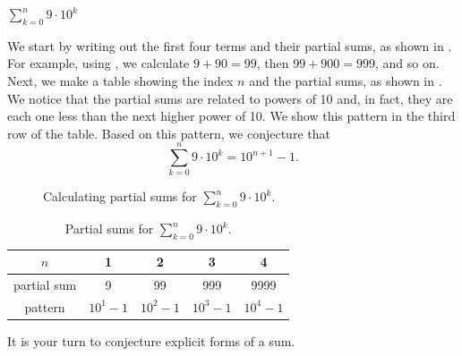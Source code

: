 \begin{exam}
\begin{apart}
            \item $\displaystyle \sum_{k=0}^n9 \cdot 10^k$
                \begin{soln}
                    We start by writing out the first four terms and their partial sums, as shown in . For example, using , we calculate $9+90=99$, then $99 + 900 = 999$, and so on.
                    Next, we make a table showing the index $n$ and the partial sums, as shown in .
                    We notice that the partial sums are related to powers of 10 and, in fact, they are each one less than the next higher power of 10.  We show this pattern in the third row of the table.  Based on this pattern, we conjecture that $$\displaystyle \sum_{k=0}^n9 \cdot 10^k=10^{n+1}-1.$$
                \end{soln}                    
                        
                \begin{figure}[hbtp]
                     \centering
                    \scalebox{0.75}{}
                    \caption{Calculating partial sums for $\displaystyle \sum_{k=0}^n9 \cdot 10^k$.}
                    \label{fig_part_sums_geometric}
                \end{figure}
  
                \begin{table}[hbtp]
                    \centering
                    \begin{tabular}{c|c|c|c|c}
                        $n$ & 1 & 2 & 3 & 4  \\ \hline
                        partial sum  & 9 & 99 & 999 & 9999 \\ \hline 
                        pattern & $10^1-1$ & $10^2-1$ & $10^3-1$ & $10^4-1$ 
                    \end{tabular}
                    \caption{Partial sums for $\displaystyle \sum_{k=0}^n9 \cdot 10^k$.}
                    \label{tab_partial_sums_geometric}
                \end{table}
    
        \end{apart}
\end{exam}

It is your turn to conjecture explicit forms of a sum.

